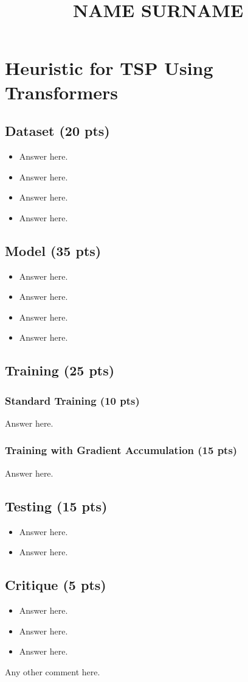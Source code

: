 \documentclass[a4paper]{article}
\title{NAME SURNAME}
\date{}
\author{}
\begin{document}
\maketitle


\section*{Heuristic for TSP Using Transformers}

\subsection*{Dataset (20 pts)}

\begin{itemize}
    \item Answer here.
    \item Answer here.
    \item Answer here.
    \item Answer here.
\end{itemize}

\subsection*{Model (35 pts)}

\begin{itemize}
    \item Answer here.
    \item Answer here.
    \item Answer here.
    \item Answer here.
\end{itemize}

\subsection*{Training (25 pts)}


\subsubsection*{Standard Training (10 pts)}
Answer here.

\subsubsection*{Training with Gradient Accumulation (15 pts)}
Answer here.


\subsection*{Testing (15 pts)}
\begin{itemize}
    \item Answer here.
    \item Answer here.
\end{itemize}

\subsection*{Critique (5 pts)}
\begin{itemize}
    \item Answer here.
    \item Answer here.
    \item Answer here.
\end{itemize}
Any other comment here.
\end{document}
